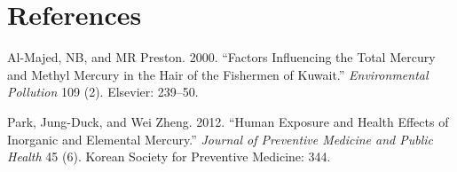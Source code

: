 \documentclass[12pt,]{article}
\begin{document}
\section*{References}\label{references}

\hypertarget{refs}{}
\hypertarget{ref-al2000factors}{}
Al-Majed, NB, and MR Preston. 2000. ``Factors Influencing the Total
Mercury and Methyl Mercury in the Hair of the Fishermen of Kuwait.''
\emph{Environmental Pollution} 109 (2). Elsevier: 239--50.

\hypertarget{ref-park2012human}{}
Park, Jung-Duck, and Wei Zheng. 2012. ``Human Exposure and Health
Effects of Inorganic and Elemental Mercury.'' \emph{Journal of
Preventive Medicine and Public Health} 45 (6). Korean Society for
Preventive Medicine: 344.
\end{document}
